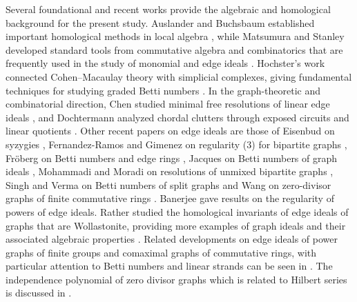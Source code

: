 \documentclass[12pt]{article}
\theoremstyle{definition}
\begin{document}
\medskip
Several foundational and recent works provide the algebraic and homological background for the present study. Auslander and Buchsbaum established important homological methods in local algebra \cite{AuslanderBuchsbaum1957}, while Matsumura and Stanley developed standard tools from commutative algebra and combinatorics that are frequently used in the study of monomial and edge ideals \cite{Matsumura1989,Stanley1996}. Hochster’s work connected Cohen--Macaulay theory with simplicial complexes, giving fundamental techniques for studying graded Betti numbers \cite{Hochster1977}. In the graph-theoretic and combinatorial direction, Chen studied minimal free resolutions of linear edge ideals \cite{Chen2010}, and Dochtermann analyzed chordal clutters through exposed circuits and linear quotients \cite{Dochtermann2021}. Other recent papers on edge ideals are those of Eisenbud on syzygies \cite{Eisenbud2005}, Fernandez-Ramos and Gimenez on regularity (3) for bipartite graphs \cite{FernandezRamosGimenez2014}, Fröberg on Betti numbers and edge rings \cite{Froberg2022,Froberg2023}, Jacques on Betti numbers of graph ideals \cite{Jacques2004}, Mohammadi and Moradi on resolutions of unmixed bipartite graphs \cite{MohammadiMoradi2015}, Singh and Verma on Betti numbers of split graphs \cite{SinghVerma2020} and Wang on zero-divisor graphs of finite commutative rings \cite{Wang2006}. Banerjee \cite{Banerjee2015} gave results on the regularity of powers of edge ideals. Rather studied the homological invariants of edge ideals of graphs that are Wollastonite, providing more examples of graph ideals and their associated algebraic properties \cite{Rather2026,Rather2024}. Related developments on edge ideals of power graphs of finite groups and comaximal graphs of commutative rings, with particular attention to Betti numbers and linear strands can be seen in \cite{RatherWang2026,RatherImranDiene2024}. The independence polynomial of zero divisor graphs which is related to Hilbert series  is discussed in \cite{bilalac,bilaltcs,bilalsc}.



\medskip
\end{document}
